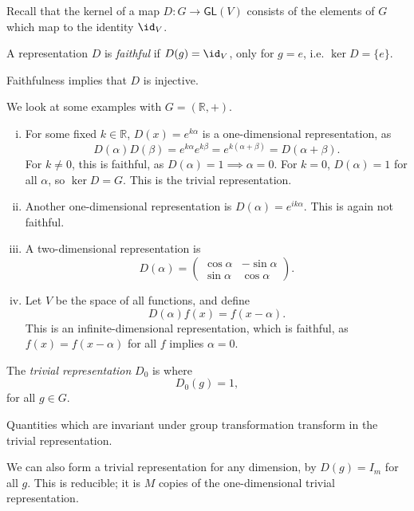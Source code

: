 \documentclass[12pt]{article}
\begin{document}

Recall that the kernel of a map $D : G \to \mathsf{GL}(V)$ consists of the elements of $G$ which map to the identity $\id_V$.

\begin{definition}
	A representation $D$ is \emph{faithful} if $D(g) = \id_V$, only for $g = e$, i.e. $\ker D = \{e\}$.
\end{definition}

Faithfulness implies that $D$ is injective.

\begin{exbox}
	We look at some examples with $G = (\mathbb{R}, +)$.
	\begin{enumerate}[(i)]
		\item For some fixed $k \in \mathbb{R}$, $D(x) = e^{k \alpha}$ is a one-dimensional representation, as
			\[
			D(\alpha) D(\beta) = e^{k \alpha} e^{k \beta} = e^{k(\alpha + \beta)} = D(\alpha + \beta).
			\]
			For $k \neq 0$, this is faithful, as $D(\alpha) = 1 \implies \alpha = 0$. For $k = 0$, $D(\alpha) = 1$ for all $\alpha$, so $\ker D = G$. This is the trivial representation.
		\item Another one-dimensional representation is $D(\alpha) = e^{ik\alpha}$. This is again not faithful.
		\item A two-dimensional representation is
			\[
			D(\alpha) =
			\begin{pmatrix}
				\cos \alpha & - \sin \alpha \\
				\sin \alpha & \cos \alpha
			\end{pmatrix}.
			\]
		\item Let $V$ be the space of all functions, and define
			\[
			D(\alpha) f(x) = f(x - \alpha).
			\]
			This is an infinite-dimensional representation, which is faithful, as $f(x) = f(x - \alpha)$ for all $f$ implies $\alpha = 0$.		
	\end{enumerate}
\end{exbox}

\begin{definition}
	The \emph{trivial representation} $D_0$ is where
	\[
	D_0(g) = 1,
	\]
	for all $g \in G$.
\end{definition}

Quantities which are invariant under group transformation transform in the trivial representation.

We can also form a trivial representation for any dimension, by $D(g) = I_m$ for all $g$. This is reducible; it is $M$ copies of the one-dimensional trivial representation.
\end{document}
